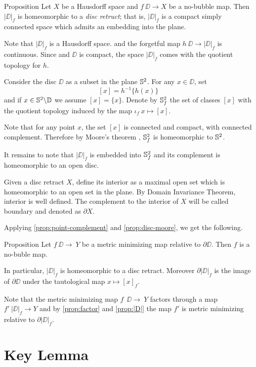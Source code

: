 \documentclass[a4paper,10pt]{amsart}
\begin{document}
\begin{thm}{Proposition}\label{prop:disc-moore}
Let $X$ be a Hausdorff space and
$f\:\DD\to X$ be a no-bubble map.
Then $|\DD|_f$ is homeomorphic to a \emph{disc retruct};
that is, $|\DD|_f$ is a compact simply connected space which admits an embedding into the plane.
\end{thm}


Note that $|\DD|_f$ is a Hausdorff space.
and the forgetful map $h\:\DD\to |\DD|_f$ is continuous.
Since and $\DD$ is compact, the space $|\DD|_f$ comes with the quotient topology for $h$. 

Consider the disc $\DD$ as a subset in the plane $\mathbb{S}^2$.
For any $x\in \DD$, set 
\[[x]=h^{-1}\{h(x)\}\]
and
if $x\in \mathbb{S}^2\backslash \mathbb{D}$ we assume $[x]=\{x\}$.
Denote by $\mathbb{S}^2_f$ the set of classes $[x]$ with the quotient topology induced by the map $\iota_f\:x\mapsto [x]$.

Note that for any point $x$, the set $[x]$ is connected and compact, with connected complement.
Therefore by Moore's theorem \cite{moore},
$\mathbb{S}^2_f$ is homeomorphic to $\mathbb{S}^2$.

It remains to note that $|\DD|_f$ is embedded into $\mathbb{S}^2_f$ and its complement is homeomorphic to an open disc.\qeds

Given a disc retract $X$,
define its interior as a maximal open set which is homeomorphic to an open set in the plane.
By Domain Invariance Theorem, interior is well defined.
The complement to the interior of $X$ will be called boundary and denoted as $\partial X$.

Applying \ref{prop:point-complement} and \ref{prop:disc-moore}, we get the following.

\begin{thm}{Proposition}\label{prop:|D|}
Let $f\:\DD\to\ Y$ be a metric minimizing map relative to $\partial \DD$.
Then $f$ is a no-buble map.

In particular,  $|\DD|_f$ is homeomorphic to a disc retract.
Moreover $\partial|\DD|_f$ is the image of $\partial \DD$
under the tautological map $x\mapsto [x]_f$.
\end{thm}

Note that the metric minimizing map $f\:\:\DD\to\ Y$ factors through a map $f'\:|\DD|_f\to Y$
and by \ref{prop:factor} and \ref{prop:|D|} 
the map $f'$
is metric minimizing relative to $\partial|\DD|_f$.

\section{Key Lemma}
\end{document}
